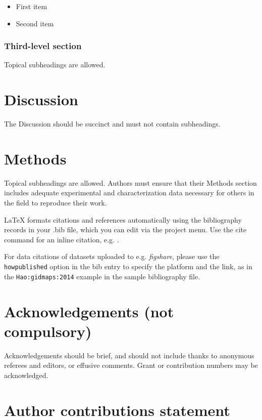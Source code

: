 \documentclass[fleqn,10pt]{wlscirep}
\begin{document}
\begin{itemize}
\item First item
\item Second item
\end{itemize}

\subsubsection*{Third-level section}
 
Topical subheadings are allowed.

\section*{Discussion}

The Discussion should be succinct and must not contain subheadings.

\section*{Methods}

Topical subheadings are allowed. Authors must ensure that their Methods section includes adequate experimental and characterization data necessary for others in the field to reproduce their work.



\noindent LaTeX formats citations and references automatically using the bibliography records in your .bib file, which you can edit via the project menu. Use the cite command for an inline citation, e.g.  \cite{Hao:gidmaps:2014}.

For data citations of datasets uploaded to e.g. \emph{figshare}, please use the \verb|howpublished| option in the bib entry to specify the platform and the link, as in the \verb|Hao:gidmaps:2014| example in the sample bibliography file.

\section*{Acknowledgements (not compulsory)}

Acknowledgements should be brief, and should not include thanks to anonymous referees and editors, or effusive comments. Grant or contribution numbers may be acknowledged.

\section*{Author contributions statement}
\end{document}
